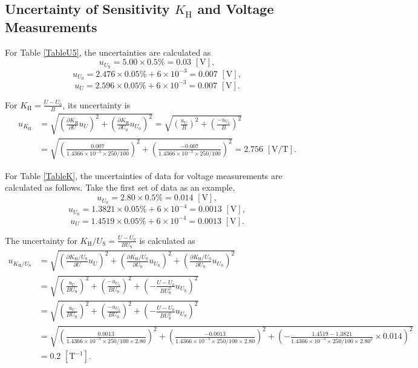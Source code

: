 \documentclass{article}
\begin{document}
	\subsection{Uncertainty of Sensitivity $K_\text{H}$ and Voltage Measurements}

For Table \ref{TableU5}, the uncertainties are calculated as
$$u_{U_\text{S}} = 5.00\times 0.5\% = 0.03\,\,[\text{V}],$$
$$u_{U_0} = 2.476\times0.05\%+6\times10^{-3} = 0.007\,\,[\text{V}],$$
$$u_U = 2.596\times0.05\%+6\times10^{-3} = 0.007\,\,[\text{V}].$$

For $K_\text{H} = \frac{U-U_0}{B}$, its uncertainty is
\begin{align*}
u_{K_\text{H}} &= \sqrt{(\frac{\partial K_\text{H}}{\partial U}u_U)^2+(\frac{\partial K_\text{H}}{\partial U_0}u_{U_0})^2} = \sqrt{(\frac{u_U}{B})^2+(\frac{-u_{U_0}}{B})^2} \\
&=\sqrt{(\frac{0.007}{1.4366\times10^{-3}\times250/100})^2+(\frac{-0.007}{1.4366\times10^{-3}\times250/100})^2} =2.756\,\,[\text{V}/\text{T}].
\end{align*}


For Table \ref{TableK}, the uncertainties of data for voltage measurements are calculated as follows. Take the first set of data as an example, 
$$u_{U_\text{S}} = 2.80\times 0.5\% = 0.014\,\,[\text{V}],$$
$$u_{U_0} = 1.3821\times0.05\%+6\times10^{-4} = 0.0013\,\,[\text{V}],$$
$$u_U = 1.4519\times0.05\%+6\times10^{-4} = 0.0013\,\,[\text{V}].$$

The uncertainty for $ \displaystyle K_\text{H}/U_\text{S} = \frac{U-U_0}{BU_\text{S}}$ is calculated as
\begin{align*}
u_{K_\text{H}/U_\text{S}} &= \sqrt{(\frac{\partial K_\text{H}/U_\text{S}}{\partial U}u_U)^2+(\frac{\partial K_\text{H}/U_\text{S}}{\partial U_0}u_{U_0})^2+(\frac{\partial K_\text{H}/U_\text{S}}{\partial U_\text{S}}u_{U_\text{S}})^2} \\
&= \sqrt{(\frac{u_U}{BU_\text{S}})^2+(\frac{-u_{U_0}}{BU_\text{S}})^2+(-\frac{U-U_0}{BU_\text{S}^2}u_{U_\text{S}})^2} \\
&= \sqrt{(\frac{u_U}{BU_\text{S}})^2+(\frac{-u_{U_0}}{BU_\text{S}})^2+(-\frac{U-U_0}{BU_\text{S}^2}u_{U_\text{S}})^2} \\
&= \sqrt{(\frac{0.0013}{1.4366\times10^{-3}\times250/100\times2.80})^2+(\frac{-0.0013}{1.4366\times10^{-3}\times250/100 \times2.80})^2+(-\frac{1.4519-1.3821}{1.4366\times10^{-3}\times250/100 \times2.80^2}\times0.014)^2} \\
&=0.2\,\,[\text{T}^{-1}].
\end{align*}
\end{document}
